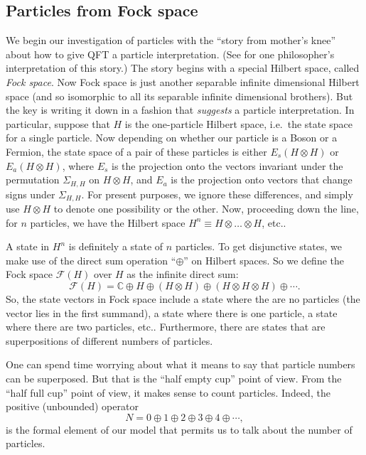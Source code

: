 \documentclass[11pt]{article}
\theoremstyle{definition}
\theoremstyle{definition}
\theoremstyle{remark}
\def\2#1{{\mathcal #1}}
\def\7#1{{\mathbb #1}}
\begin{document}
\subsection{Particles from Fock space} \label{focked}

We begin our investigation of particles with the ``story from mother's
knee'' about how to give QFT a particle interpretation.  (See
\cite{tell} for one philosopher's interpretation of this story.)  The
story begins with a special Hilbert space, called \emph{Fock space}.
Now Fock space is just another separable infinite dimensional Hilbert
space (and so isomorphic to all its separable infinite dimensional
brothers).  But the key is writing it down in a fashion that
\emph{suggests} a particle interpretation.  In particular, suppose
that $H$ is the one-particle Hilbert space, i.e.\ the state space for
a single particle.  Now depending on whether our particle is a Boson
or a Fermion, the state space of a pair of these particles is either
$E_s(H \otimes H)$ or $E_a(H \otimes H)$, where $E_s$ is the
projection onto the vectors invariant under the permutation $\Sigma
_{H,H}$ on $H\otimes H$, and $E_a$ is the projection onto vectors that
change signs under $\Sigma _{H,H}$.  For present purposes, we ignore
these differences, and simply use $H\otimes H$ to denote one
possibility or the other.  Now, proceeding down the line, for $n$
particles, we have the Hilbert space $H^n\equiv H\otimes \dots \otimes
H$, etc..

A state in $H^n$ is definitely a state of $n$ particles.  To get
disjunctive states, we make use of the direct sum operation
``$\oplus$'' on Hilbert spaces.  So we define the Fock space $\2F (H)$
over $H$ as the infinite direct sum:
$$ \2F (H)= \7C \oplus H \oplus (H\otimes H)\oplus (H\otimes H\otimes H)\oplus \cdots
.$$ So, the state vectors in Fock space include a state where the are
no particles (the vector lies in the first summand), a state where
there is one particle, a state where there are two particles, etc..
Furthermore, there are states that are superpositions of different
numbers of particles.

One can spend time worrying about what it means to say that particle
numbers can be superposed.  But that is the ``half empty cup'' point
of view.  From the ``half full cup'' point of view, it makes sense to
count particles.  Indeed, the positive (unbounded) operator
$$ N=0\oplus 1\oplus 2\oplus 3 \oplus 4 \oplus \cdots ,$$ 
is the formal element of our model that permits us to talk about the
number of particles.
\end{document}
